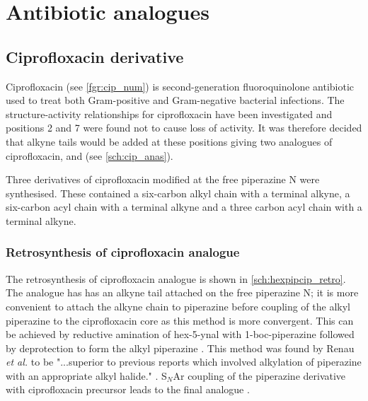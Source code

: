 \section{Antibiotic analogues}

\subsection{Ciprofloxacin derivative}

Ciprofloxacin  (see \ref{fgr:cip_num}) is second-generation fluoroquinolone antibiotic used to treat both Gram-positive and Gram-negative bacterial infections\cite{Oliphant2002}.
The structure-activity relationships for ciprofloxacin have been investigated \cite{Renau1996} and positions 2 and 7 were found not to cause loss of activity. It was therefore decided that alkyne tails would be added at these positions giving two analogues of ciprofloxacin,  and  (see \ref{sch:cip_anas}).

Three derivatives of ciprofloxacin modified at the free piperazine N were synthesised. These contained a six-carbon alkyl chain with a terminal alkyne, a six-carbon acyl chain with a terminal alkyne and a three carbon acyl chain with a terminal alkyne.

\subsubsection{Retrosynthesis of ciprofloxacin analogue }

The retrosynthesis of ciprofloxacin analogue  is shown in \ref{sch:hexpipcip_retro}.
The analogue has has an alkyne tail attached on the free piperazine N; it is more convenient to attach the alkyne chain to piperazine before coupling of the alkyl piperazine  to the ciprofloxacin core  as this method is more convergent. This can be achieved by reductive amination of hex-5-ynal  with 1-boc-piperazine  followed by deprotection to form the alkyl piperazine . This method was found by Renau \textit{et al.} to be "...superior to previous reports which involved alkylation of piperazine with an appropriate alkyl halide." \cite{Renau1996,JPS:JPS2600571210}. 
S$_N$Ar coupling of the piperazine derivative with ciprofloxacin precursor  leads to the final analogue .

